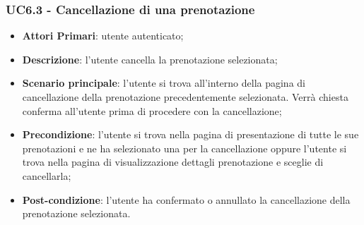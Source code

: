 \subsubsection{UC6.3 - Cancellazione di una prenotazione}
\begin{itemize}
	\item \textbf{Attori Primari}: utente autenticato;
	\item \textbf{Descrizione}: l'utente cancella la prenotazione selezionata;
	\item \textbf{Scenario principale}: l'utente si trova all'interno della pagina di cancellazione della prenotazione precedentemente selezionata. Verrà chiesta conferma all'utente prima di procedere con la cancellazione;
	\item \textbf{Precondizione}: l'utente si trova nella pagina di presentazione di tutte le sue prenotazioni e ne ha selezionato una per la cancellazione oppure l'utente si trova nella pagina di visualizzazione dettagli prenotazione e sceglie di cancellarla;
	\item \textbf{Post-condizione}: l'utente ha confermato o annullato la cancellazione della prenotazione selezionata.
\end{itemize}
